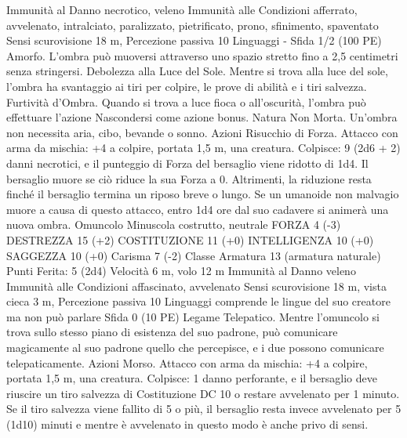 \begin{multicols}{2}
Immunità al Danno necrotico, veleno
Immunità alle Condizioni afferrato, avvelenato, intralciato,
paralizzato, pietrificato, prono, sfinimento, spaventato
Sensi scurovisione 18 m, Percezione passiva 10
Linguaggi -
Sfida 1/2 (100 PE)
Amorfo. L’ombra può muoversi attraverso uno spazio stretto
fino a 2,5 centimetri senza stringersi.
Debolezza alla Luce del Sole. Mentre si trova alla luce del sole,
l’ombra ha svantaggio ai tiri per colpire, le prove di abilità e i tiri
salvezza.
Furtività d’Ombra. Quando si trova a luce fioca o all’oscurità,
l’ombra può effettuare l’azione Nascondersi come azione bonus.
Natura Non Morta. Un’ombra non necessita aria, cibo, bevande
o sonno.
Azioni
Risucchio di Forza. Attacco con arma da mischia: +4 a colpire,
portata 1,5 m, una creatura.
Colpisce: 9 (2d6 + 2) danni necrotici, e il punteggio di Forza del
bersaglio viene ridotto di 1d4. Il bersaglio muore se ciò riduce la
sua Forza a 0. Altrimenti, la riduzione resta finché il bersaglio
termina un riposo breve o lungo.
Se un umanoide non malvagio muore a causa di questo attacco,
entro 1d4 ore dal suo cadavere si animerà una nuova ombra.
Omuncolo
Minuscola costrutto, neutrale
FORZA 4 (-3)
DESTREZZA 15 (+2)
COSTITUZIONE 11 (+0)
INTELLIGENZA 10 (+0)
SAGGEZZA 10 (+0)
Carisma 7 (-2)
Classe Armatura 13 (armatura naturale)
\hspace*{0pt}\hfill{Punti Ferita}: 5 (2d4)
Velocità 6 m, volo 12 m
Immunità al Danno veleno
Immunità alle Condizioni affascinato, avvelenato
Sensi scurovisione 18 m, vista cieca 3 m, Percezione passiva 10
Linguaggi comprende le lingue del suo creatore ma non può
parlare
Sfida 0 (10 PE)
Legame Telepatico. Mentre l’omuncolo si trova sullo stesso piano
di esistenza del suo padrone, può comunicare magicamente al suo
padrone quello che percepisce, e i due possono comunicare
telepaticamente.
Azioni
Morso. Attacco con arma da mischia: +4 a colpire, portata 1,5
m, una creatura.
Colpisce: 1 danno perforante, e il bersaglio deve riuscire un tiro
salvezza di Costituzione DC 10 o restare avvelenato per 1
minuto. Se il tiro salvezza viene fallito di 5 o più, il bersaglio
resta invece avvelenato per 5 (1d10) minuti e mentre è
avvelenato in questo modo è anche privo di sensi.
 

\end{multicols}

